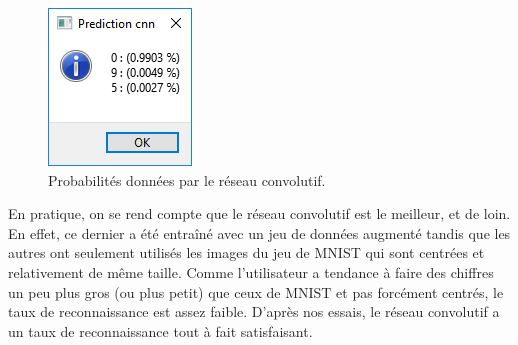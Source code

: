 \begin{figure}[h]
  \centering
  \includegraphics[scale=0.9]{assets/prediction-widget}
  \caption{Probabilités données par le réseau convolutif.}
\end{figure}

En pratique, on se rend compte que le réseau convolutif est le meilleur, et de loin.
En effet, ce dernier a été entraîné avec un jeu de données augmenté tandis que les autres 
ont seulement utilisés les images du jeu de MNIST qui sont centrées et relativement de 
même taille.
Comme l'utilisateur a tendance à faire des chiffres un peu plus gros (ou plus petit) 
que ceux de MNIST et pas forcément centrés, le taux de reconnaissance est assez faible.
D'après nos essais, le réseau convolutif a un taux de reconnaissance tout à fait 
satisfaisant.
